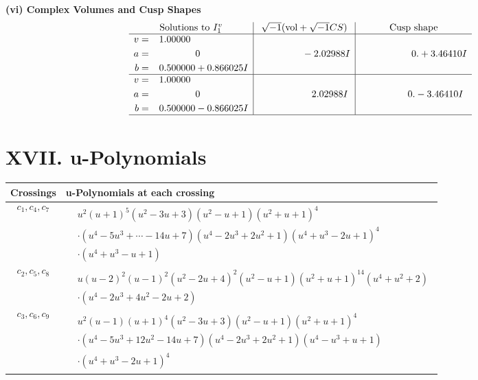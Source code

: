 \documentclass[1p]{elsarticle_modified}
\theoremstyle{definition}
\newcommand{\I}{\sqrt{-1}}
\begin{document}
\newpage\flushleft \textbf{(vi) Complex Volumes and Cusp Shapes}
$$\begin{array}{c|c|c}  
\text{Solutions to }I^v_{1}& \I (\text{vol} + \sqrt{-1}CS) & \text{Cusp shape}\\
 \hline 
\begin{aligned}
v &= \phantom{-}1.00000\phantom{ +0.000000I} \\
a &= \phantom{-0.000000 } 0 \\
b &= \phantom{-}0.500000 + 0.866025 I\end{aligned}
 & \phantom{-0.000000 } -2.02988 I & \phantom{-0.000000 -}0. + 3.46410 I \\ \hline\begin{aligned}
v &= \phantom{-}1.00000\phantom{ +0.000000I} \\
a &= \phantom{-0.000000 } 0 \\
b &= \phantom{-}0.500000 - 0.866025 I\end{aligned}
 & \phantom{-0.000000 -}2.02988 I & \phantom{-0.000000 } 0. - 3.46410 I\\
 \hline 
 \end{array}$$\newpage
\newpage\renewcommand{\arraystretch}{1}
\centering \section*{ XVII. u-Polynomials}
\begin{tabular}{m{50pt}|m{274pt}}
Crossings & \hspace{64pt}u-Polynomials at each crossing \\
\hline $$\begin{aligned}c_{1},c_{4},c_{7}\end{aligned}$$&$\begin{aligned}
&u^2(u+1)^5(u^2-3 u+3)(u^2- u+1)(u^2+u+1)^4\\
&\cdot(u^4-5 u^3+\cdots-14 u+7)(u^4-2 u^3+2 u^2+1)(u^4+u^3-2 u+1)^4\\
&\cdot(u^4+u^3- u+1)
\end{aligned}$\\
\hline $$\begin{aligned}c_{2},c_{5},c_{8}\end{aligned}$$&$\begin{aligned}
&u(u-2)^2(u-1)^2(u^{2}-2 u+4)^{2}(u^{2}-u+1)(u^{2}+u+1)^{14}(u^{4}+u^{2}+2)\\
&\cdot(u^4-2 u^3+4 u^2-2 u+2)
\end{aligned}$\\
\hline $$\begin{aligned}c_{3},c_{6},c_{9}\end{aligned}$$&$\begin{aligned}
&u^2(u-1)(u+1)^4(u^2-3 u+3)(u^2- u+1)(u^2+u+1)^4\\
&\cdot(u^4-5 u^3+12 u^2-14 u+7)(u^4-2 u^3+2 u^2+1)(u^4- u^3+u+1)\\
&\cdot(u^4+u^3-2 u+1)^4
\end{aligned}$\\
\hline
\end{tabular}\newpage\renewcommand{\arraystretch}{1}
\end{document}
